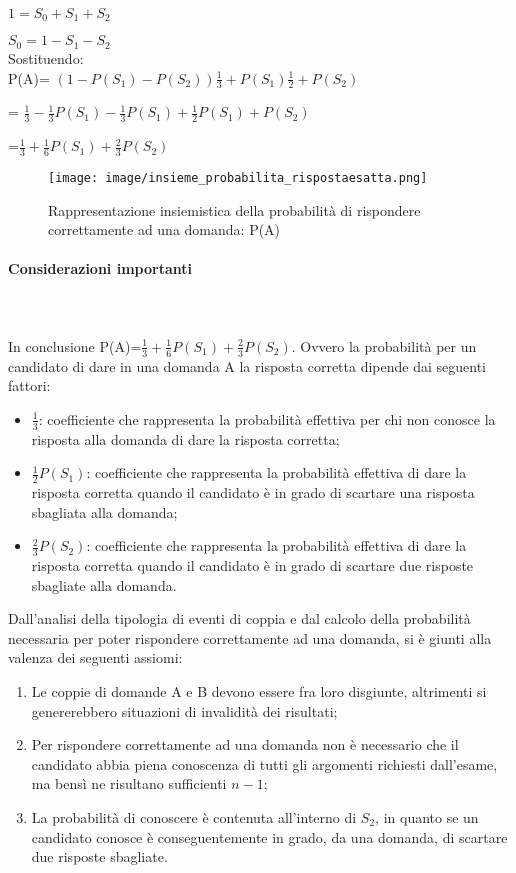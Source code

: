 \documentclass[10pt,a4paper]{article}
\begin{document}
$1=S_{0}+S_{1}+S_{2}$

$S_0=1-S_{1}-S_{2}$ \\

Sostituendo: \\

P(A)= $(1-P(S_1) - P(S_2))\frac{1}{3}+P(S_1)\frac{1}{2}+P(S_2)$

    = $\frac{1}{3}-\frac{1}{3}P(S_1)-\frac{1}{3}P(S_1)+\frac{1}{2}P(S_1)+P(S_2)$
    
    =$\frac{1}{3}+\frac{1}{6}P(S_1)+\frac{2}{3}P(S_2)$
   

\begin{figure}[H]
\centering
	\texttt{[image: image/insieme\_probabilita\_rispostaesatta.png]}
	\caption{Rappresentazione insiemistica della probabilit\`a di rispondere correttamente ad una domanda: P(A)}
\end{figure}
  
  
  
 \paragraph{Considerazioni importanti} \mbox{}\\\\
 \label{Considerazioni importanti}
  In conclusione P(A)=$\frac{1}{3}+\frac{1}{6}P(S_1)+\frac{2}{3}P(S_2)$.
  Ovvero la probabilit\`a  per un candidato di dare in una domanda A la risposta corretta dipende dai seguenti fattori:
  \begin{itemize}
  \item $\frac{1}{3}$: coefficiente che rappresenta la probabilit\`a effettiva per chi non conosce la risposta alla domanda di dare la risposta corretta;
  \item $\frac{1}{2}P(S_1)$: coefficiente che rappresenta la probabilit\`a effettiva di  dare la risposta corretta quando il candidato \`e in grado di scartare una risposta sbagliata alla domanda;
   \item $\frac{2}{3}P(S_2)$: coefficiente che rappresenta la probabilit\`a effettiva di  dare la risposta corretta quando il candidato \`e in grado di scartare due risposte sbagliate alla domanda.
  \end{itemize}
  \noindent
  Dall'analisi della tipologia di eventi di coppia e dal calcolo della probabilit\`a necessaria per poter rispondere correttamente ad una domanda, si \`e giunti alla valenza dei seguenti assiomi:
  \begin{enumerate}
  \item Le coppie di domande A e B devono essere fra loro disgiunte, altrimenti si genererebbero situazioni di invalidit\`a dei risultati;
  \item Per rispondere correttamente ad una domanda non \`e necessario che il candidato abbia piena conoscenza di tutti gli argomenti richiesti dall'esame, ma bens\`i ne risultano sufficienti $n-1$;
  \item La probabilit\`a di conoscere \`e contenuta all'interno di $S_{2}$, in quanto se un candidato conosce \`e conseguentemente in grado, da una domanda, di scartare due risposte sbagliate.
  \end{enumerate}
  
\end{document}
